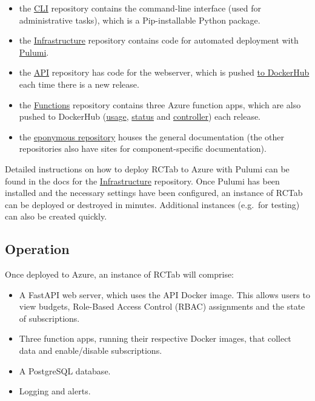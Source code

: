 \documentclass[
]{article}
\providecommand{\tightlist}{%
  \setlength{\itemsep}{0pt}\setlength{\parskip}{0pt}}
\begin{document}
\begin{itemize}
\tightlist
\item
  the \href{https://github.com/alan-turing-institute/rctab-cli}{CLI}
  repository contains the command-line interface (used for
  administrative tasks), which is a Pip-installable Python package.
\item
  the
  \href{https://github.com/alan-turing-institute/rctab-infrastructure}{Infrastructure}
  repository contains code for automated deployment with
  \href{https://www.pulumi.com/}{Pulumi}.
\item
  the \href{https://github.com/alan-turing-institute/rctab-api}{API}
  repository has code for the webserver, which is pushed
  \href{https://hub.docker.com/r/turingrc/rctab-api}{to DockerHub} each
  time there is a new release.
\item
  the
  \href{https://github.com/alan-turing-institute/rctab-functions}{Functions}
  repository contains three Azure function apps, which are also pushed
  to DockerHub
  (\href{https://hub.docker.com/r/turingrc/rctab-usage}{usage},
  \href{https://hub.docker.com/r/turingrc/rctab-status}{status} and
  \href{https://hub.docker.com/r/turingrc/rctab-controller}{controller})
  each release.
\item
  the \href{https://github.com/alan-turing-institute/rctab}{eponymous
  repository} houses the general documentation (the other repositories
  also have sites for component-specific documentation).
\end{itemize}

Detailed instructions on how to deploy RCTab to Azure with Pulumi can be
found in the docs for the
\href{https://github.com/alan-turing-institute/rctab-infrastructure}{Infrastructure}
repository. Once Pulumi has been installed and the necessary settings
have been configured, an instance of RCTab can be deployed or destroyed
in minutes. Additional instances (e.g.~for testing) can also be created
quickly.

\subsection{Operation}\label{operation}

Once deployed to Azure, an instance of RCTab will comprise:

\begin{itemize}
\tightlist
\item
  A FastAPI web server, which uses the API Docker image. This allows
  users to view budgets, Role-Based Access Control (RBAC) assignments
  and the state of subscriptions.
\item
  Three function apps, running their respective Docker images, that
  collect data and enable/disable subscriptions.
\item
  A PostgreSQL database.
\item
  Logging and alerts.
\end{itemize}
\end{document}
